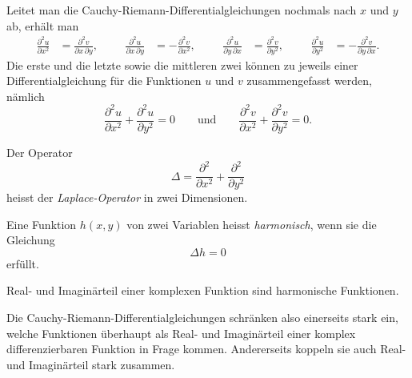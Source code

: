 Leitet man die Cauchy-Riemann-Differentialgleichungen nochmals nach
$x$ und $y$ ab, erhält man
\begin{equation*}
\begin{aligned}
\frac{\partial^2 u}{\partial x^2}
&=
\frac{\partial^2 v}{\partial x\,\partial y},
&&&
\frac{\partial^2 u}{\partial x\,\partial y}
&=
-\frac{\partial^2 v}{\partial x^2},
&&&
\frac{\partial^2 u}{\partial y\,\partial x}
&=
\frac{\partial^2 v}{\partial y^2},
&&&
\frac{\partial^2 u}{\partial y^2}
&=
-\frac{\partial^2 v}{\partial y\,\partial x}.
\end{aligned}
\end{equation*}
Die erste und die letzte sowie die mittleren zwei können zu jeweils
einer Differentialgleichung für die Funktionen $u$ und $v$ zusammengefasst
werden, nämlich
\begin{equation*}
\frac{\partial^2 u}{\partial x^2}
+
\frac{\partial^2 u}{\partial y^2}
=
0
\qquad\text{und}\qquad
\frac{\partial^2 v}{\partial x^2}
+
\frac{\partial^2 v}{\partial y^2}
=
0.
\end{equation*}

\begin{definition}
Der Operator
\[
\Delta =
\frac{\partial^2}{\partial x^2}
+
\frac{\partial^2}{\partial y^2}
\]
heisst der {\em Laplace-Operator} in zwei Dimensionen.
%
%
\end{definition}

\begin{definition}
\label{buch:funktionentheorie:definition:harmonisch}
Eine Funktion $h(x,y)$ von zwei Variablen heisst {\em harmonisch}, wenn sie
die Gleichung
\[
\Delta h=0
\]
erfüllt.
%
%
\end{definition}

\begin{satz}
Real- und Imaginärteil einer komplexen Funktion sind harmonische Funktionen.
\end{satz}

Die Cauchy-Riemann-Differentialgleichungen schränken also einerseits stark
ein, welche Funktionen überhaupt als Real- und Imaginärteil einer
komplex differenzierbaren Funktion in Frage kommen.
Andererseits koppeln sie auch Real- und Imaginärteil stark zusammen.

